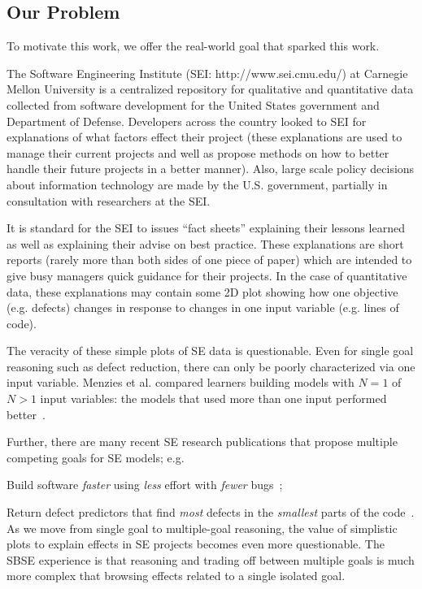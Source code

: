 \subsection{Our Problem}
To motivate this work, we offer the real-world goal that sparked this work.

The Software Engineering Institute (SEI:
http://www.sei.cmu.edu/) at Carnegie Mellon
University is a centralized repository for
qualitative and quantitative data collected from
software development for the United States
government and Department of Defense. Developers
across the country looked to SEI for explanations of
what factors effect their project (these
explanations are used to manage their current
projects and well as propose methods on how to
better handle their future projects in a better
manner).  Also, large scale policy decisions about
information technology are made by the
U.S. government, partially in consultation with
researchers at the SEI.

It is standard for the
SEI to issues ``fact sheets'' explaining their
lessons learned as well as explaining their advise
on best practice. These explanations are short
reports (rarely more than both sides of one piece of
paper) which are intended to give busy managers
quick guidance for their projects.  In the case of
quantitative data, these explanations may
contain some 2D plot showing how one
objective  (e.g. defects) changes in
response to changes in one input variable
(e.g. lines of code).

The veracity of these simple plots
of SE data is questionable. Even
for single goal reasoning such as defect reduction,
there  can only be  poorly
characterized via one input variable.  Menzies et
al. compared learners building models with $N=1$
of $N>1$ input variables: the models that used more
than one input performed better~\cite{me07b}.

Further, there are many recent SE research publications that
propose multiple competing goals for SE models; e.g.
\bi
\item 
Build software
{\em faster} using {\em less} effort with {\em fewer} bugs~\cite{elrawas10};
\item
Return defect predictors that find {\em most} defects in the {\em smallest}
parts of the code~\cite{arisholm06}.
\ei
As we move from single goal to
multiple-goal reasoning, the value of
simplistic  plots to explain effects in SE projects becomes even more
questionable. The SBSE experience is that reasoning
and trading off between multiple goals is much more
complex that browsing effects related to a single
isolated goal.

